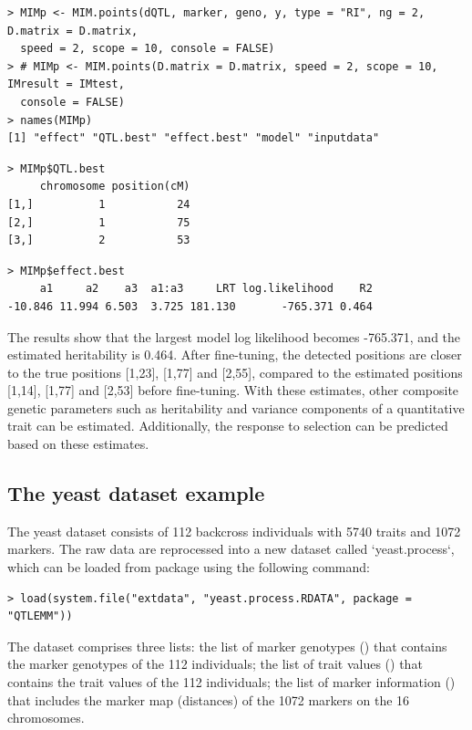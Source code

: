 \begin{verbatim}
> MIMp <- MIM.points(dQTL, marker, geno, y, type = "RI", ng = 2, D.matrix = D.matrix, 
  speed = 2, scope = 10, console = FALSE)
> # MIMp <- MIM.points(D.matrix = D.matrix, speed = 2, scope = 10, IMresult = IMtest,
  console = FALSE)
> names(MIMp)
[1] "effect" "QTL.best" "effect.best" "model" "inputdata"  
\end{verbatim}

\begin{verbatim}
> MIMp$QTL.best
     chromosome position(cM)
[1,]          1           24
[2,]          1           75
[3,]          2           53
\end{verbatim}

\begin{verbatim}
> MIMp$effect.best
     a1     a2    a3  a1:a3     LRT log.likelihood    R2
-10.846 11.994 6.503  3.725 181.130       -765.371 0.464
\end{verbatim}

\noindent The results show that the largest model log likelihood becomes -765.371, and the estimated heritability is 0.464. After fine-tuning, the detected positions are closer to the true positions [1,23], [1,77] and [2,55], compared to the estimated positions [1,14], [1,77] and [2,53] before fine-tuning. With these estimates, other composite genetic parameters such as heritability and variance components of a quantitative trait can be estimated. Additionally, the response to selection can be predicted based on these estimates.

\subsection{The yeast dataset example}

The yeast dataset \citep{Brem-2005} consists of 112 backcross individuals with 5740 traits and 1072 markers. The raw data are reprocessed into a new dataset called `yeast.process`, which can be loaded from  package using the following command:

\begin{verbatim}
> load(system.file("extdata", "yeast.process.RDATA", package = "QTLEMM"))
\end{verbatim}

\noindent The  dataset comprises three lists: the list of marker genotypes () that contains the marker genotypes of the 112 individuals; the list of trait values () that contains the trait values of the 112 individuals; the list of marker information () that includes the marker map (distances) of the 1072 markers on the 16 chromosomes.

